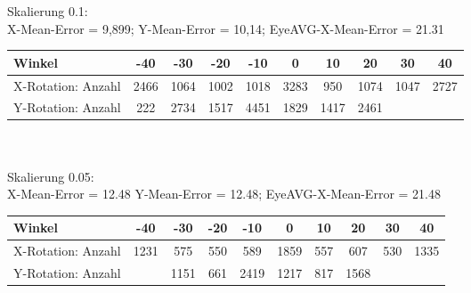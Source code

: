 Skalierung 0.1:\\
X-Mean-Error = 9,899; Y-Mean-Error = 10,14; EyeAVG-X-Mean-Error = 21.31\\
\begin{tabular}{|l|c|c|c|c|c|c|c|c|c|}
\hline 
Winkel&-40&-30&-20&-10&0&10&20&30&40\\
\hline 
X-Rotation: Anzahl&2466&1064&1002&1018&3283&950&1074&1047&2727\\ 
\hline 
Y-Rotation: Anzahl&222&2734&1517&4451&1829&1417&2461&&\\
\hline
\end{tabular}\\\\
Skalierung 0.05:\\
X-Mean-Error = 12.48 Y-Mean-Error = 12.48; EyeAVG-X-Mean-Error = 21.48\\
\begin{tabular}{|l|c|c|c|c|c|c|c|c|c|}
\hline 
Winkel&-40&-30&-20&-10&0&10&20&30&40\\
\hline 
X-Rotation: Anzahl&1231&575&550&589&1859&557&607&530&1335\\ 
\hline 
Y-Rotation: Anzahl&&1151&661&2419&1217&817&1568&&\\
\hline
\end{tabular}